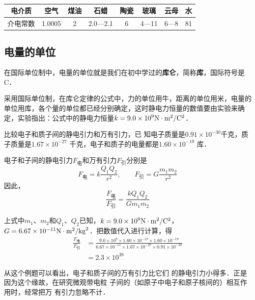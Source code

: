 \begin{table}[htbp]
	\centering
	\caption{}\label{tab_B_6-1}
    \begin{tabular}{c|ccccccc}
	\toprule
	电介质 & 空气&煤油&石蜡&陶瓷&玻璃&云母&水\\
	\midrule
	介电常数 & 1.0005&2&2.0—2.1&6&4—11&6—8&81\\
	\bottomrule
    \end{tabular}
\end{table}

\subsection{电量的单位} 
在国际单位制中，电量的单位就是我们在初中学过的\textbf{库仑}，简称\textbf{库}，国际符号是C．

采用国际单位制，在库仑定律的公式中，力的单位用牛，距离的单位用米，电量的单位用库，各个量的单位都已经分别确定，这时静电力恒量的数值要由实验来确定，实验指出：公式中的静电力恒量$k=9.0\times 10^9{\rm N}\cdot {\rm m}^2/{\rm C^2}$．

\begin{example}
比较电子和质子间的静电引力和万有引力，已
知电子质量是$0.91\times 10^{-30}$千克，质子质量是$1.67\times 10^{-27}$
千克，电子和质子的电量都是$1.60\times10^{-19}$
库．
\end{example}

    
\begin{solution}
电子和子间的静电引力$F_{\text{电}}$和万有引力$F_{\text{引}}$分别是
\[F_{\text{电}} =k\frac{Q_1Q_2}{r^2} ,\qquad   F_{\text{引}}=G\frac{m_1m_2}{r^2} \]
因此，
\[\frac{F_{\text{电}}}{F_{\text{引}}}=\frac{kQ_1Q_2}{Gm_1m_2} \]

上式中$m_1$、$m_2$和$Q_1$、$Q_2$已知，$k=9.0\times 10^9{\rm N}\cdot {\rm m^2}/{{\rm C}^2}$，
$G=6.67\times10^{-11}{\rm N}\cdot {\rm m^2}/{{\rm kg}^2}$．把数值代入进行计算，得
\[\begin{split}
    \frac{F_{\text{电}}}{F_{\text{引}}}&=\frac{9.0\times 10^9\times1.60\times10^{-19}\times1.60\times10^{-19}}{6.67\times10^{-11}\times 1.67\times10^{-27}\times 0.91\times10^{-30}}\\
    &=2.3\times 10^{39}
\end{split}\]
\end{solution}


从这个例题可以看出，电子和质子间的万有引力比它们
的静电引力小得多．正是因为这个缘故，在研究微观带电粒
子间的（如原子中电子和原子核间的）相互作用时，经常把万
有引力忽略不计．



